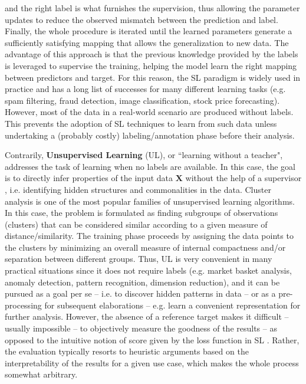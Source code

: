 and the right label
is what furnishes the supervision, thus allowing the parameter updates to reduce the observed mismatch between the prediction and label.
Finally, the whole procedure is iterated until the learned parameters generate a sufficiently satisfying mapping that allows the generalization to new data. 
The advantage of this approach is that the previous knowledge provided by the labels is leveraged to supervise the training, helping the model learn the right mapping between predictors and target.
For this reason, the SL paradigm is widely used in practice and has a long list of successes for many different learning tasks (e.g. spam filtering, fraud detection, image classification, stock price forecasting).
However, most of the data in a real-world scenario are produced without labels. This prevents the adoption of SL techniques to learn from such data unless undertaking a (probably costly) labeling/annotation phase before their analysis. 

Contrarily, \textbf{Unsupervised Learning} (UL), or ``learning without a teacher", addresses the task of learning when no labels are available. 
In this case, the goal is to directly infer properties of the input data $\boldsymbol X$ without the help of a supervisor \cite[Chapter 14]{friedman2009elements}, i.e. identifying hidden structures and commonalities in the data.
Cluster analysis is one of the most popular families of  unsupervised learning algorithms.
In this case, the problem is formulated as finding subgroups of observations (clusters) that can be considered similar according to a given measure of distance/similarity.
The training phase proceeds by assigning the data points to the clusters by minimizing an overall measure of internal compactness and/or separation between different groups.
Thus, UL is very convenient in many practical situations since it does not require labels (e.g. market basket analysis, anomaly detection, pattern recognition, dimension reduction), and it can be pursued as a goal per se -- i.e. to discover hidden patterns in data -- or as a pre-processing for subsequent elaborations -- e.g. learn a convenient representation for further analysis.
However, the absence of a reference target makes it difficult -- usually impossible -- to objectively measure the goodness of the results -- as opposed to the intuitive notion of score given by the loss function in SL \cite{von2012clustering}.
Rather, the evaluation typically resorts to heuristic arguments based on the interpretability of the results for a given use case, which makes the whole process somewhat arbitrary.


